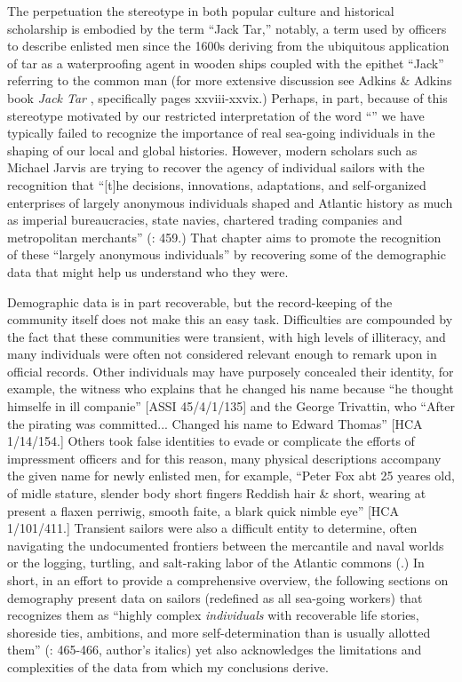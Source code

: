   The perpetuation the  stereotype in both popular culture and historical scholarship is embodied by the term “Jack Tar,” notably, a term used by officers to describe enlisted men since the 1600s deriving from the ubiquitous application of tar as a waterproofing agent in wooden ships coupled with the epithet “Jack” referring to the common man (for more extensive discussion see Adkins \& Adkins book \textit{Jack Tar} \citeyear*{AdkinsAdkins2008}, specifically pages xxviii-xxvix.) Perhaps, in part, because of this stereotype motivated by our restricted interpretation of the word “” we have typically failed to recognize the importance of real sea-going individuals in the shaping of our local and global histories. However, modern scholars such as Michael Jarvis are trying to recover the agency of individual sailors with the recognition that “[t]he decisions, innovations, adaptations, and self-organized enterprises of largely anonymous individuals shaped  and Atlantic history as much as imperial bureaucracies, state navies, chartered trading companies and metropolitan merchants” (\citealt{Jarvis2010}: 459.) That chapter aims to promote the recognition of these “largely anonymous individuals” by recovering some of the demographic data that might help us understand who they were. 

Demographic data is in part recoverable, but the record-keeping of the community itself does not make this an easy task. Difficulties are compounded by the fact that these communities were transient, with high levels of illiteracy, and many individuals were often not considered relevant enough to remark upon in official records. Other individuals may have purposely concealed their identity, for example, the witness who explains that he changed his name because “he thought himselfe in ill companie” [ASSI 45/4/1/135] and the  George Trivattin, who “After the pirating was committed... Changed his name to Edward Thomas” [HCA 1/14/154.] Others took false identities to evade or complicate the efforts of impressment officers and for this reason, many physical descriptions accompany the given name for newly enlisted men, for example, “Peter Fox abt 25 yeares old, of midle stature, slender body short fingers Reddish hair \& short, wearing at present a flaxen perriwig, smooth faite, a blark quick nimble eye” [HCA 1/101/411.] Transient sailors were also a difficult entity to determine, often navigating the undocumented frontiers between the mercantile and naval worlds \citep{Fusaro2015} or the logging, turtling, and salt-raking labor of the Atlantic commons (\citealt{Jarvis2010}.) In short, in an effort to provide a comprehensive overview, the following sections on demography present data on sailors (redefined as all sea-going workers) that recognizes them as “highly complex \textit{individuals} with recoverable life stories, shoreside ties, ambitions, and more self-determination than is usually allotted them” (\citealt{Jarvis2010}: 465-466, author’s italics) yet also acknowledges the limitations and complexities of the data from which my conclusions derive. 

